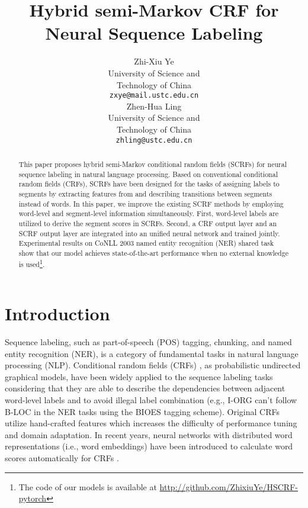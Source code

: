 \documentclass[11pt,a4paper]{article}
\title{Hybrid semi-Markov CRF for Neural Sequence Labeling}
\author{Zhi-Xiu Ye \\
  University of Science and \\
  Technology of China \\
  {\tt zxye@mail.ustc.edu.cn} \\\And
  Zhen-Hua Ling \\
  University of Science and \\
  Technology of China \\
  {\tt zhling@ustc.edu.cn} \\}
\date{}
\begin{document}
\maketitle
\begin{abstract}
This paper proposes hybrid semi-Markov conditional random fields (SCRFs) for neural sequence labeling in natural language processing.
  Based on conventional conditional random fields (CRFs), SCRFs have been designed for the tasks of assigning labels to segments by extracting features from and describing transitions between segments instead of words.
In this paper, we improve the existing SCRF methods by employing word-level and segment-level information simultaneously.
  First, word-level labels are utilized to derive the segment scores in SCRFs.
  Second, a CRF output layer and an SCRF output layer are integrated into an unified neural network and trained jointly.
Experimental results on CoNLL 2003 named entity recognition (NER) shared task show that our model achieves state-of-the-art performance
  when no external knowledge is used\footnote{The code of our models is available at \url{http://github.com/ZhixiuYe/HSCRF-pytorch}}.
\end{abstract}

\section{Introduction}

Sequence labeling, such as part-of-speech (POS) tagging, chunking, and named entity recognition (NER), is a category of fundamental tasks in natural language processing (NLP).
Conditional random fields (CRFs) \cite{lafferty2001conditional}, as probabilistic undirected graphical models, have been widely applied to the sequence labeling tasks considering that they are able to describe the dependencies between adjacent word-level labels and to avoid illegal label combination
(e.g., I-ORG can't follow B-LOC in the NER tasks using the BIOES tagging scheme).
Original CRFs utilize hand-crafted features which increases the difficulty of performance tuning and domain adaptation.
In recent years, neural networks with distributed word representations  (i.e., word embeddings) \cite{mikolov2013distributed, pennington2014glove}
have been introduced to calculate word scores automatically for CRFs \cite{chiu2015named,huang2015bidirectional}.
\end{document}
